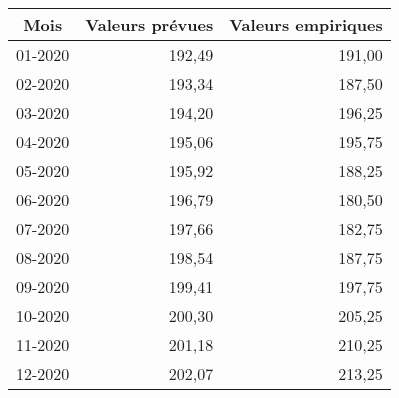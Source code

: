 \begin{tabular}{rrr}
\toprule
\multicolumn{1}{c}{Mois} & \multicolumn{1}{l}{Valeurs prévues} & \multicolumn{1}{c}{Valeurs empiriques} \\
\midrule
01-2020 & 192,49 & 191,00\\
02-2020 & 193,34 & 187,50 \\
03-2020 & 194,20 & 196,25 \\
04-2020 & 195,06 & 195,75 \\
05-2020 & 195,92 & 188,25 \\
06-2020 & 196,79 & 180,50 \\
07-2020 & 197,66 & 182,75 \\
08-2020 & 198,54 & 187,75 \\
09-2020 & 199,41 & 197,75 \\
10-2020 & 200,30 & 205,25 \\
11-2020 & 201,18 & 210,25 \\
12-2020 & 202,07 & 213,25 \\
\bottomrule
\end{tabular}%
